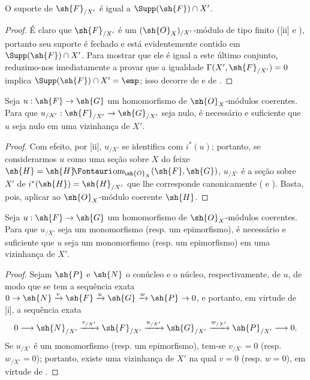 \documentclass[oneside]{amsart}
\makeatletter
\newcommand{\ega@arrow}[2]{\mathchoice{#1}{#2}{#2}{#2}}
\renewcommand{\to}{\ega@arrow{\longrightarrow}{\rightarrow}}
\newcommand*{\ega@sheafop}[3]{\sh{#1}#2\textup{\kern-2.2pt{\Fontauri\slshape #3}}}
\newcommand*{\shHom}{\ega@sheafop{H}{}{om}}
\newcommand{\oldpage}[2][]{{\marginnote{\normalfont\textbf{#1}~|~#2}}\ignorespaces}
\let\EGAOriginalLabel\label
\renewcommand{\label}[1]{\phantomsection\EGAOriginalLabel{#1}}
\makeatother
\begin{document}
\begin{corollary}[10.8.12]
\label{I.10.8.12}
O suporte de $\sh{F}_{/X'}$ é igual a $\Supp(\sh{F})\cap X'$.
\end{corollary}

\begin{proof}
É claro que $\sh{F}_{/X'}$ é um $(\sh{O}_X)_{/X'}$-módulo de tipo finito ([ii] e ),
\oldpage[I]{198}
portanto seu suporte é fechado  e está evidentemente contido em $\Supp(\sh{F})\cap X'$.
Para mostrar que ele é igual a este último conjunto, reduzimo-nos imediatamente a provar que a igualdade $\Gamma(X',\sh{F}_{/X'})=0$ implica $\Supp(\sh{F})\cap X'=\emp$; isso decorre de  e de .
\end{proof}

\begin{corollary}[10.8.13]
\label{I.10.8.13}
Seja $u:\sh{F}\to\sh{G}$ um homomorfismo de $\sh{O}_X$-módulos coerentes.
Para que $u_{/X'}:\sh{F}_{/X'}\to\sh{G}_{/X'}$ seja nulo, é necessário e suficiente que $u$ seja nulo em uma vizinhança de $X'$.
\end{corollary}

\begin{proof}
Com efeito, por [ii], $u_{/X'}$ se identifica com $i^*(u)$; portanto, se considerarmos $u$ como uma seção sobre $X$ do feixe $\sh{H}=\shHom_{\sh{O}_X}(\sh{F},\sh{G})$, $u_{/X'}$ é a seção sobre $X'$ de $i^*(\sh{H})=\sh{H}_{/X'}$ que lhe corresponde canonicamente ( e ).
Basta, pois, aplicar  ao $\sh{O}_X$-módulo coerente $\sh{H}$.
\end{proof}

\begin{corollary}[10.8.14]
\label{I.10.8.14}
Seja $u:\sh{F}\to\sh{G}$ um homomorfismo de $\sh{O}_X$-módulos coerentes.
Para que $u_{/X'}$ seja um monomorfismo (resp. um epimorfismo), é necessário e suficiente que $u$ seja um monomorfismo (resp. um epimorfismo) em uma vizinhança de $X'$.
\end{corollary}

\begin{proof}
Sejam $\sh{P}$ e $\sh{N}$ o conúcleo e o núcleo, respectivamente, de $u$, de modo que se tem a sequência exata $0\to\sh{N}\xrightarrow{v}\sh{F}\xrightarrow{u}\sh{G}\xrightarrow{w}\sh{P}\to 0$, e portanto, em virtude de [i], a sequência exata
\[
  0\to\sh{N}_{/X'}\xrightarrow{v_{/X'}}\sh{F}_{/X'}\xrightarrow{u_{/X'}}\sh{G}_{/X'}\xrightarrow{w_{/X'}}\sh{P}_{/X'}\to 0.
\]
Se $u_{/X'}$ é um monomorfismo (resp. um epimorfismo), tem-se $v_{/X'}=0$ (resp. $w_{/X'}=0$); portanto, existe uma vizinhança de $X'$ na qual $v=0$ (resp. $w=0$), em virtude de .
\end{proof}
\end{document}
